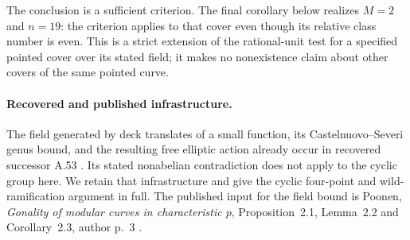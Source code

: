 \documentclass[11pt,a4paper]{article}
\begin{document}
The conclusion is a sufficient criterion. The final corollary
below realizes $M=2$ and $n=19$: the criterion applies to that
cover even though its relative class number is even. This is
a strict extension of the rational-unit test for a specified
pointed cover over its stated field; it makes no nonexistence
claim about other covers of the same pointed curve.

\paragraph{Recovered and published infrastructure.}
The field generated by deck translates of a small function, its
Castelnuovo--Severi genus bound, and the resulting free elliptic
action already occur in recovered successor A.53
\cite[A.53]{ASrun}. Its stated nonabelian contradiction does not
apply to the cyclic group here. We retain that infrastructure and
give the cyclic four-point and wild-ramification argument in full.
The published input for the field bound is Poonen,
\emph{Gonality of modular curves in characteristic $p$},
Proposition~2.1, Lemma~2.2 and Corollary~2.3, author p.~3
\cite{Poonen2007Gonality}.
\end{document}
